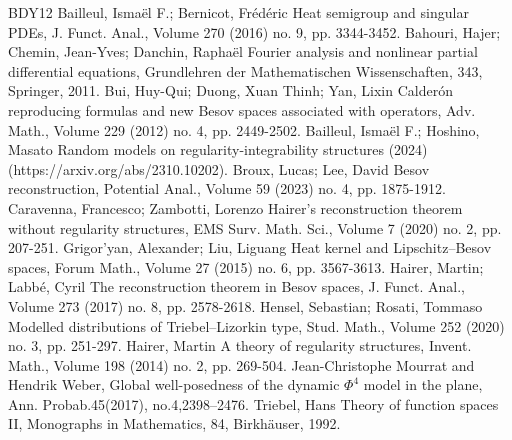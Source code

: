 
\begin{thebibliography}{BDY12}
 Bailleul, Ismaël F.; Bernicot, Frédéric Heat semigroup and singular PDEs, J. Funct. Anal., Volume 270 (2016) no. 9, pp. 3344-3452.
 Bahouri, Hajer; Chemin, Jean-Yves; Danchin, Raphaël Fourier analysis and nonlinear partial differential equations, Grundlehren der Mathematischen Wissenschaften, 343, Springer, 2011.
 Bui, Huy-Qui; Duong, Xuan Thinh; Yan, Lixin Calderón reproducing formulas and new Besov spaces associated with operators, Adv. Math., Volume 229 (2012) no. 4, pp. 2449-2502.
 Bailleul, Ismaël F.; Hoshino, Masato Random models on regularity-integrability structures (2024) (https://arxiv.org/abs/2310.10202).
 Broux, Lucas; Lee, David Besov reconstruction, Potential Anal., Volume 59 (2023) no. 4, pp. 1875-1912.
 Caravenna, Francesco; Zambotti, Lorenzo Hairer’s reconstruction theorem without regularity structures, EMS Surv. Math. Sci., Volume 7 (2020) no. 2, pp. 207-251.
 Grigor’yan, Alexander; Liu, Liguang Heat kernel and Lipschitz–Besov spaces, Forum Math., Volume 27 (2015) no. 6, pp. 3567-3613.
 Hairer, Martin; Labbé, Cyril The reconstruction theorem in Besov spaces, J. Funct. Anal., Volume 273 (2017) no. 8, pp. 2578-2618.
 Hensel, Sebastian; Rosati, Tommaso Modelled distributions of Triebel–Lizorkin type, Stud. Math., Volume 252 (2020) no. 3, pp. 251-297.
 Hairer, Martin A theory of regularity structures, Invent. Math., Volume 198 (2014) no. 2, pp. 269-504.
 Jean-Christophe Mourrat and Hendrik Weber, Global well-posedness of the dynamic $\Phi^4$ model in the plane, Ann. Probab.45(2017), no.4,2398–2476.
 Triebel, Hans Theory of function spaces II, Monographs in Mathematics, 84, Birkhäuser, 1992.
\end{thebibliography}
